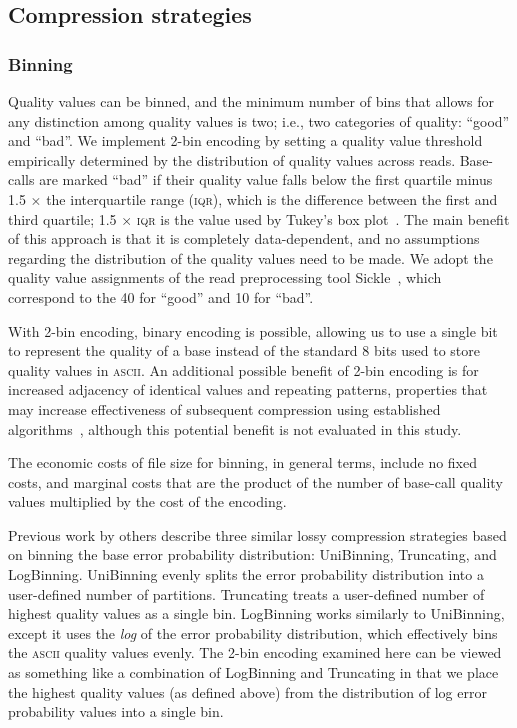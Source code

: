 \documentclass[fleqn,10pt,lineno]{wlpeerj} %
\begin{document}
\subsection*{Compression strategies}

\subsubsection*{Binning}

Quality values can be binned, and the minimum number of bins that
allows for any distinction among quality values is two; i.e., two
categories of quality: ``good'' and ``bad''. We implement 2-bin
encoding by setting a quality value threshold empirically determined
by the distribution of quality values across reads. Base-calls are
marked ``bad'' if their quality value falls below the first quartile
minus 1.5 $\times$ the interquartile range (\textsc{iqr}), which is
the difference between the first and third quartile; 1.5 $\times$
\textsc{iqr} is the value used by Tukey's box
plot~\citep{mcgill1978variations}. The main benefit of this approach is
that it is completely data-dependent, and no assumptions regarding the
distribution of the quality values need to be made. We adopt the
quality value assignments of the read preprocessing tool
Sickle~\citep{sickle}, which correspond to the 40 for ``good'' and 10
for ``bad''.

With 2-bin encoding, binary encoding is possible, allowing us to use a
single bit to represent the quality of a base instead of the standard
8 bits used to store quality values in \textsc{ascii}. An additional
possible benefit of 2-bin encoding is for increased adjacency of
identical values and repeating patterns, properties that may increase
effectiveness of subsequent compression using established
algorithms~\citep{HUFFMAN:1952nr,Ziv77auniversal,
  DBLP:journals/tit/ZivL78}, although this potential benefit is not
evaluated in this study.

The economic costs of file size for binning, in general terms, include
no fixed costs, and marginal costs that are the product of the number
of base-call quality values multiplied by the cost of the encoding.

Previous work by others \citep{Wan:2012kq} describe three similar lossy
compression strategies based on binning the base error probability
distribution: UniBinning, Truncating, and LogBinning. UniBinning
evenly splits the error probability distribution into a user-defined
number of partitions. Truncating treats a user-defined number of
highest quality values as a single bin. LogBinning works similarly to
UniBinning, except it uses the \emph{log} of the error probability
distribution, which effectively bins the \textsc{ascii} quality values
evenly. The 2-bin encoding examined here can be viewed as something
like a combination of LogBinning and Truncating in that we place the
highest quality values (as defined above) from the distribution of log
error probability values into a single bin.
\end{document}
